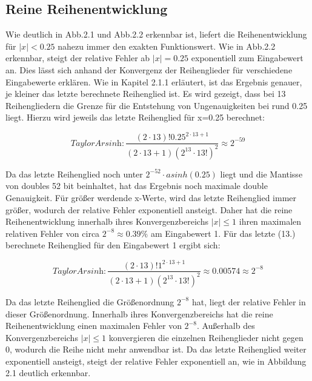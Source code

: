 \documentclass[course=erap] {aspdoc}
\begin{document}
    \subsection{Reine Reihenentwicklung}\label{subsec:reine-reihenentwicklung}
    Wie deutlich in Abb.2.1 und Abb.2.2 erkennbar ist, liefert die Reihenentwicklung für $|x|<0.25$ nahezu immer den exakten Funktionswert.
    Wie in Abb.2.2 erkennbar, steigt der relative Fehler ab $|x| = 0.25$ exponentiell zum Eingabewert an.
    Dies lässt sich anhand der Konvergenz der Reihenglieder für verschiedene Eingabewerte erklären.
    Wie in Kapitel 2.1.1 erläutert, ist das Ergebnis genauer, je kleiner das letzte berechnete Reihenglied ist.
    Es wird gezeigt, dass bei 13 Reihengliedern die Grenze für die Entstehung von Ungenauigkeiten bei rund 0.25 liegt.
    Hierzu wird jeweils das letzte Reihenglied für x=0.25 berechnet:

    \[
    \textit{TaylorArsinh}: \frac{(2\cdot13)!0.25^{2\cdot13 + 1}}{(2\cdot13 + 1)(2^13\cdot13!)^2} \approx 2^{-59}
    \]

    Da das letzte Reihenglied noch unter $2^{-52}\cdot asinh(0.25)$ liegt und die Mantisse von doubles 52 bit beinhaltet, hat das Ergebnis noch maximale double Genauigkeit.
    Für größer werdende x-Werte, wird das letzte Reihenglied immer größer, wodurch der relative Fehler exponentiell ansteigt.
    Daher hat die reine Reihenentwicklung innerhalb ihres Konvergenzbereichs $|x|\leq1$ ihren maximalen relativen Fehler von circa $2^{-8} \approx 0.39\%$ am Eingabewert 1.
    Für das letzte (13.) berechnete Reihenglied für den Eingabewert 1 ergibt sich:

    \[
    \textit{TaylorArsinh}: \frac{(2\cdot13)!1^{2\cdot13 + 1}}{(2\cdot13 + 1)(2^13\cdot13!)^2} \approx 0.00574 \approx 2^{-8}
    \]

    Da das letzte Reihenglied die Größenordnung $2^{-8}$ hat, liegt der relative Fehler in dieser Größenordnung.
    Innerhalb ihres Konvergenzbereichs hat die reine Reihenentwicklung einen maximalen Fehler von $2^{-8}$.
    Außerhalb des Konvergenzbereichs $|x|\leq1$ konvergieren die einzelnen Reihenglieder nicht gegen 0, wodurch die Reihe nicht mehr anwendbar ist. 
    Da das letzte Reihenglied weiter exponentiell ansteigt, steigt der relative Fehler exponentiell an, wie in Abbildung 2.1 deutlich erkennbar.
\end{document}
